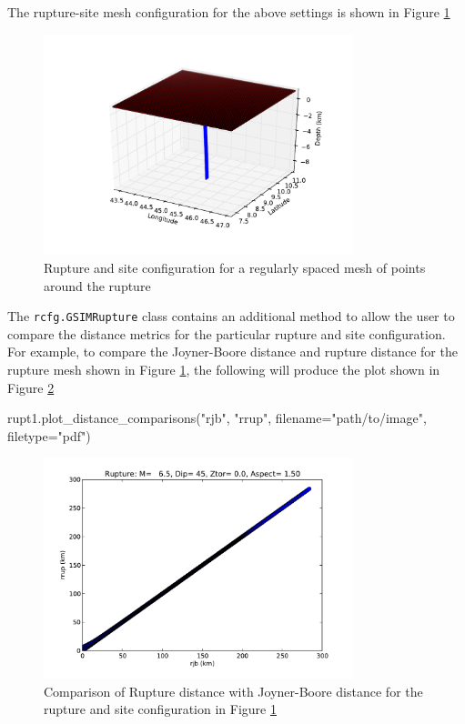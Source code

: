 \noindent The rupture-site mesh configuration for the above settings is shown in Figure \ref{fig:rupt_config_mesh}

\begin{figure}[htbp]
	\centering
		\includegraphics[width=9cm]{./figures/trellis/rupt_config_regular_mesh.pdf}
	\caption{Rupture and site configuration for a regularly spaced mesh of points around the rupture}
	\label{fig:rupt_config_mesh}
\end{figure}

The \verb=rcfg.GSIMRupture= class contains an additional method to allow the user to compare the distance metrics for the particular rupture and site configuration. For example, to compare the Joyner-Boore distance and rupture distance for the rupture mesh shown in Figure \ref{fig:rupt_config_mesh}, the following will produce the plot shown in Figure \ref{fig:dist_comp_mesh}

\begin{python}
rupt1.plot_distance_comparisons("rjb",
                                "rrup",
                                filename="path/to/image",
                                filetype="pdf")
\end{python}

\begin{figure}[htbp]
	\centering
		\includegraphics[width=9cm]{./figures/trellis/rupt_distance_comp_1.pdf}
	\caption{Comparison of Rupture distance with Joyner-Boore distance for the rupture and site configuration in Figure \ref{fig:rupt_config_mesh}}
	\label{fig:dist_comp_mesh}
\end{figure}



